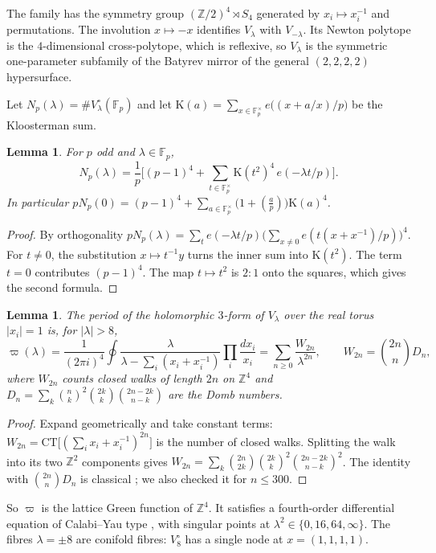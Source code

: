 \documentclass[11pt]{amsart}
\newtheorem{lemma}[theorem]{Lemma}
\theoremstyle{definition}
\newcommand{\F}{\mathbb{F}}
\newcommand{\Z}{\mathbb{Z}}
\newcommand{\Kl}{\mathrm{K}}
\newcommand{\leg}[2]{\left(\frac{#1}{#2}\right)}
\begin{document}
The family has the symmetry group $(\Z/2)^4\rtimes S_4$ generated by $x_i\mapsto x_i^{-1}$ and permutations. The involution $x\mapsto-x$ identifies $V_\lambda$ with $V_{-\lambda}$. Its Newton polytope is the $4$-dimensional cross-polytope, which is reflexive, so $V_\lambda$ is the symmetric one-parameter subfamily of the Batyrev mirror of the general $(2,2,2,2)$ hypersurface.

Let $N_p(\lambda)=\#V_\lambda^\circ(\F_p)$ and let $\Kl(a)=\sum_{x\in\F_p^\times}e\big((x+a/x)/p\big)$ be the Kloosterman sum.

\begin{lemma}\label{lem:kl}
For $p$ odd and $\lambda\in\F_p$,
\[ N_p(\lambda)=\frac1p\Big[(p-1)^4+\sum_{t\in\F_p^\times}\Kl(t^2)^4\,e(-\lambda t/p)\Big]. \]
In particular $pN_p(0)=(p-1)^4+\sum_{a\in\F_p^\times}\big(1+\leg ap\big)\Kl(a)^4$.
\end{lemma}

\begin{proof}
By orthogonality $pN_p(\lambda)=\sum_{t}e(-\lambda t/p)\big(\sum_{x\ne0}e(t(x+x^{-1})/p)\big)^4$. For $t\neq0$, the substitution $x\mapsto t^{-1}y$ turns the inner sum into $\Kl(t^2)$. The term $t=0$ contributes $(p-1)^4$. The map $t\mapsto t^2$ is $2:1$ onto the squares, which gives the second formula.
\end{proof}

\begin{lemma}\label{lem:period}
The period of the holomorphic $3$-form of $V_\lambda$ over the real torus $|x_i|=1$ is, for $|\lambda|>8$,
\[ \varpi(\lambda)=\frac{1}{(2\pi i)^4}\oint\frac{\lambda}{\lambda-\sum_i(x_i+x_i^{-1})}\prod_i\frac{dx_i}{x_i}=\sum_{n\ge0}\frac{W_{2n}}{\lambda^{2n}},\qquad W_{2n}=\binom{2n}{n}D_n, \]
where $W_{2n}$ counts closed walks of length $2n$ on $\Z^4$ and $D_n=\sum_k\binom nk^2\binom{2k}k\binom{2n-2k}{n-k}$ are the Domb numbers.
\end{lemma}

\begin{proof}
Expand geometrically and take constant terms: $W_{2n}=\mathrm{CT}\big[(\sum_i x_i+x_i^{-1})^{2n}\big]$ is the number of closed walks. Splitting the walk into its two $\Z^2$ components gives $W_{2n}=\sum_k\binom{2n}{2k}\binom{2k}{k}^2\binom{2n-2k}{n-k}^2$. The identity with $\binom{2n}{n}D_n$ is classical \cite{Guttmann}; we also checked it for $n\le 300$.
\end{proof}

So $\varpi$ is the lattice Green function of $\Z^4$. It satisfies a fourth-order differential equation of Calabi--Yau type \cite{Guttmann,AESZ}, with singular points at $\lambda^2\in\{0,16,64,\infty\}$. The fibres $\lambda=\pm8$ are conifold fibres: $V^\circ_{8}$ has a single node at $x=(1,1,1,1)$.
\end{document}
